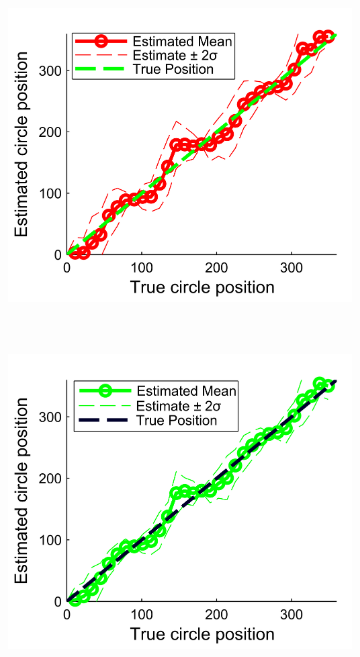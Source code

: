 \begin{figure}
\begin{subfigure}{7cm}
	\includegraphics[scale=1]{line_circular_fusion_mean_5_gold.png}
	\caption{}
	\label{Figure: circular_fusion_mean_5_gold}	
	\end{subfigure}\\
	\begin{subfigure}{7cm}
	\includegraphics[scale=1]{line_circular_fusion_mean_10_gold.png}
	\caption{}	
	\label{Figure: circular_fusion_mean_10_gold}
	\end{subfigure}
	\begin{subfigure}{7cm}

\end{subfigure}
\end{figure}
